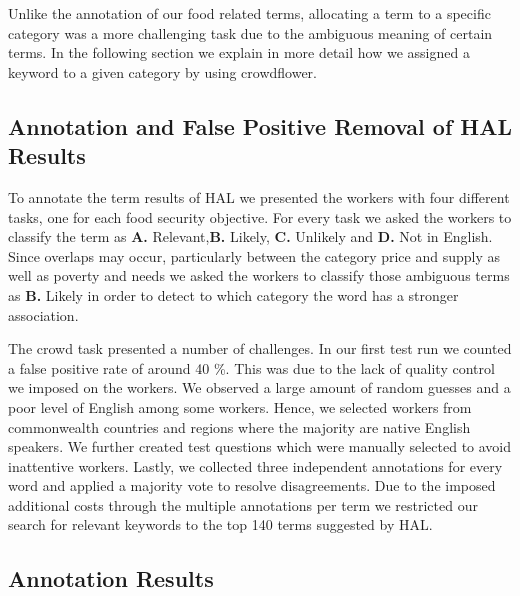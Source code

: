 Unlike the annotation of our food related terms, allocating a term to a specific category was a more challenging task due to the ambiguous meaning of certain terms. In the following section we explain in more detail how we assigned a keyword to a given category by using crowdflower. 




\subsection{Annotation and False Positive Removal of HAL Results}

To annotate the term results of HAL we presented the workers with four different tasks, one for each food security objective. For every task we asked the workers to classify the term as \textbf{A.} Relevant,\textbf{B.} Likely, \textbf{C.} Unlikely and \textbf{D.}  Not in English. Since overlaps may occur, particularly between the category price and supply as well as poverty and needs we asked the workers to classify those ambiguous terms as \textbf{B.} Likely in order to detect to which category the word has a stronger association. 

The crowd task presented a number of challenges. In our first test run we counted a false positive rate of around 40 \%. This was due to the lack of quality control we imposed on the workers. We observed a large amount of random guesses and a poor level of English among some workers. Hence, we selected workers from commonwealth countries and regions where the majority are native English speakers. We further created test questions which were manually selected to  avoid inattentive workers. Lastly, we collected three independent annotations for every word and applied a majority vote to resolve disagreements. Due to the imposed additional costs through the multiple annotations per term we restricted our search for relevant keywords to the top 140 terms suggested by HAL.


\subsection{Annotation Results}

